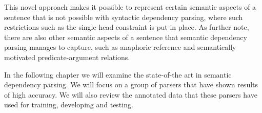 This novel approach makes it possible to represent certain semantic aspects of a sentence that is not possible with syntactic dependency parsing, where such restrictions such as the single-head constraint is put in place. As  further note, there are also other semantic aspects of a sentence that semantic dependency parsing manages to capture, such as anaphoric reference and semantically motivated predicate-argument relations.

In the following chapter we will examine the state-of-the art in semantic dependency parsing. We will focus on a group of parsers that have shown results of high accuracy. We will also review the annotated data that these parsers have used for training, developing and testing.